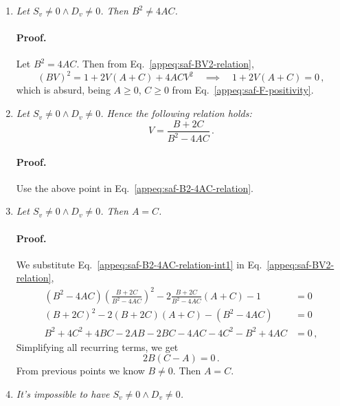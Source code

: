 \begin{tabproof}
\begin{enumerate}
	We multiply Eq.~\eqref{appeq:saf-Su-sc-ABC} by $BV \neq 0$ (see points above) on both sides,
	\[
		BV (1+2AV) S_u + (BV)^2 D_u = 2t BV(2A+B) \, ,
	\]
	and substitute from Eq.~\eqref{appeq:saf-Du-sc-ABC} $BV S_v = - (1+2CV) D_v + 2t(B+2C)$,
	\[
	\begin{aligned}
		- (1+2CV)(1+2AV) D_v + 2t(B+2C)(1+2AV) + (BV)^2 D_u &= 2t BV(2A+B) \\
		2t(B+2C)(1+2AV) &= 2t BV(2A+B) \\
		B + 2ABV + 2C + 4ACV &= 2ABV + B^2 V \, ,
	\end{aligned}
	\]
	Passing from first to second line we used Eq.~\eqref{appeq:saf-BV2-relation}, and in the passage below $t>0$. Last line implies Eq.~\eqref{appeq:saf-B2-4AC-relation}.
	\item \textit{Let $S_v \neq 0 \land D_v \neq 0$. Then $B^2 \neq 4AC$. }
	
	\paragraph{Proof.}
	
	Let $B^2 = 4AC$. Then from Eq.~\eqref{appeq:saf-BV2-relation},
	\[
		(BV)^2 = 1 + 2V (A+C) + 4ACV^2
		\quad\implies\quad
		1 + 2V (A+C) = 0 \, ,
	\]
	which is absurd, being $A\ge0$, $C\ge0$ from Eq.~\eqref{appeq:saf-F-positivity}. 
	\item  \textit{Let $S_v \neq 0 \land D_v \neq 0$. Hence the following relation holds:}
	\begin{equation}\label{appeq:saf-B2-4AC-relation-int1}
		V = \frac{B+2C}{B^2 - 4AC} \, .
	\end{equation}
	
	\paragraph{Proof.}
	
	Use the above point in Eq.~\eqref{appeq:saf-B2-4AC-relation}.
	\item \textit{Let $S_v \neq 0 \land D_v \neq 0$. Then $A=C$.}
	
	\paragraph{Proof.}
	
	We substitute Eq.~\eqref{appeq:saf-B2-4AC-relation-int1} in Eq.~\eqref{appeq:saf-BV2-relation},
	\[
	\begin{aligned}
		(B^2 - 4AC) \left(\frac{B+2C}{B^2 - 4AC}\right)^2 - 2\frac{B+2C}{B^2 - 4AC} (A+C) - 1 &= 0 \\
		(B+2C)^2 - 2(B+2C)(A+C) - (B^2 - 4AC) &= 0 \\
		B^2 + 4C^2 + 4BC - 2AB - 2BC - 4AC - 4C^2 - B^2 + 4AC &= 0 \, ,
	\end{aligned}
	\]
	Simplifying all recurring terms, we get
	\[
		2B(C-A) = 0 \, .
	\]
	From previous points we know $B\neq 0$. Then $A=C$.
	\item \textit{It's impossible to have $S_v \neq 0 \land D_v \neq 0$.}
	

\end{enumerate}
\end{tabproof}
